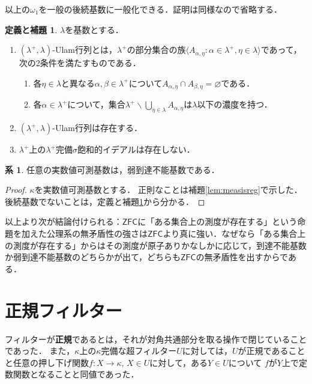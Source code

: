 \documentclass[uplatex]{jsarticle}
\newcommand{\ZFC}{\mathsf{ZFC}}
\newcommand{\seq}[1]{{\langle#1\rangle}}
\renewcommand\emptyset{\varnothing}
\renewcommand{\setminus}{\smallsetminus}
\theoremstyle{definition}
\newtheorem{cor}[thm]{系}
\newtheorem{defiandlem}[thm]{定義と補題}
\begin{document}
	以上の$\omega_1$を一般の後続基数に一般化できる．証明は同様なので省略する．
	
	\begin{defiandlem}\label{dl:lambdaplusulam}
		$\lambda$を基数とする．
		\begin{enumerate}
			\item $(\lambda^+, \lambda)$-Ulam行列とは，$\lambda^+$の部分集合の族$\seq{ A_{\alpha, \eta} : \alpha \in \lambda^+, \eta \in \lambda }$であって，次の2条件を満たすものである．
			\begin{enumerate}
				\item 各$\eta \in \lambda$と異なる$\alpha, \beta \in \lambda^+$について$A_{\alpha,\eta} \cap A_{\beta,\eta} = \emptyset$である．
				\item 各$\alpha \in \lambda^+$について，集合$\lambda^+ \setminus \bigcup_{\eta \in \lambda} A_{\alpha,\eta}$は$\lambda$以下の濃度を持つ．
			\end{enumerate}
			\item $(\lambda^+, \lambda)$-Ulam行列は存在する．
			\item $\lambda^+$上の$\lambda^+$完備$\sigma$飽和的イデアルは存在しない．
		\end{enumerate}
	\end{defiandlem}
	
	\begin{cor}
		任意の実数値可測基数は，弱到達不能基数である．
	\end{cor}
	\begin{proof}
		$\kappa$を実数値可測基数とする．
		正則なことは補題\ref{lem:measisreg}で示した．
		後続基数でないことは，定義と補題\ref{dl:lambdaplusulam}から分かる．
	\end{proof}
	
	以上より次が結論付けられる：$\ZFC$に「ある集合上の測度が存在する」という命題を加えた公理系の無矛盾性の強さは$\ZFC$より真に強い．なぜなら「ある集合上の測度が存在する」からはその測度が原子ありかなしかに応じて，到達不能基数か弱到達不能基数のどちらかが出て，どちらも$\ZFC$の無矛盾性を出すからである．
	
	\section{正規フィルター}
	
	フィルターが\textbf{正規}であるとは，それが対角共通部分を取る操作で閉じていることであった．
	また，$\kappa$上の$\kappa$完備な超フィルター$U$に対しては，$U$が正規であることと任意の押し下げ関数$f \colon X \to \kappa$, $X \in U$に対して，ある$Y \in U$について $f$が$Y$上で定数関数となることと同値であった．
	
\end{document}
